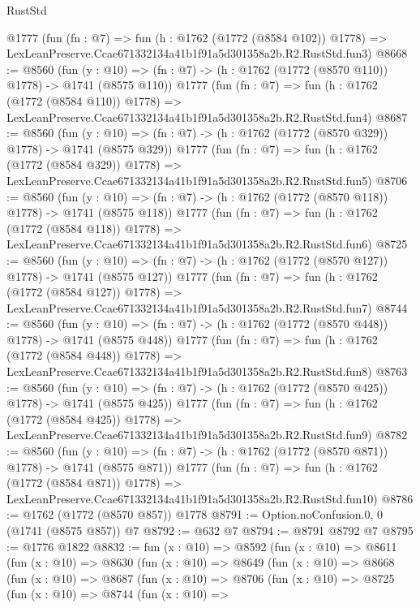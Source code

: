 \begin{lexlean}{RustStd}
\begin{coremodule}
    @1777
    (fun (fn : @7) =>
    fun (h : @1762 (@1772 (@8584 @102)) @1778) =>
    LexLeanPreserve.Ccae671332134a41b1f91a5d301358a2b.R2.RustStd.fun3)
@8668 := @8560
    (fun (y : @10) => (fn : @7) -> (h : @1762 (@1772 (@8570 @110)) @1778) -> @1741 (@8575 @110))
    @1777
    (fun (fn : @7) =>
    fun (h : @1762 (@1772 (@8584 @110)) @1778) =>
    LexLeanPreserve.Ccae671332134a41b1f91a5d301358a2b.R2.RustStd.fun4)
@8687 := @8560
    (fun (y : @10) => (fn : @7) -> (h : @1762 (@1772 (@8570 @329)) @1778) -> @1741 (@8575 @329))
    @1777
    (fun (fn : @7) =>
    fun (h : @1762 (@1772 (@8584 @329)) @1778) =>
    LexLeanPreserve.Ccae671332134a41b1f91a5d301358a2b.R2.RustStd.fun5)
@8706 := @8560
    (fun (y : @10) => (fn : @7) -> (h : @1762 (@1772 (@8570 @118)) @1778) -> @1741 (@8575 @118))
    @1777
    (fun (fn : @7) =>
    fun (h : @1762 (@1772 (@8584 @118)) @1778) =>
    LexLeanPreserve.Ccae671332134a41b1f91a5d301358a2b.R2.RustStd.fun6)
@8725 := @8560
    (fun (y : @10) => (fn : @7) -> (h : @1762 (@1772 (@8570 @127)) @1778) -> @1741 (@8575 @127))
    @1777
    (fun (fn : @7) =>
    fun (h : @1762 (@1772 (@8584 @127)) @1778) =>
    LexLeanPreserve.Ccae671332134a41b1f91a5d301358a2b.R2.RustStd.fun7)
@8744 := @8560
    (fun (y : @10) => (fn : @7) -> (h : @1762 (@1772 (@8570 @448)) @1778) -> @1741 (@8575 @448))
    @1777
    (fun (fn : @7) =>
    fun (h : @1762 (@1772 (@8584 @448)) @1778) =>
    LexLeanPreserve.Ccae671332134a41b1f91a5d301358a2b.R2.RustStd.fun8)
@8763 := @8560
    (fun (y : @10) => (fn : @7) -> (h : @1762 (@1772 (@8570 @425)) @1778) -> @1741 (@8575 @425))
    @1777
    (fun (fn : @7) =>
    fun (h : @1762 (@1772 (@8584 @425)) @1778) =>
    LexLeanPreserve.Ccae671332134a41b1f91a5d301358a2b.R2.RustStd.fun9)
@8782 := @8560
    (fun (y : @10) => (fn : @7) -> (h : @1762 (@1772 (@8570 @871)) @1778) -> @1741 (@8575 @871))
    @1777
    (fun (fn : @7) =>
    fun (h : @1762 (@1772 (@8584 @871)) @1778) =>
    LexLeanPreserve.Ccae671332134a41b1f91a5d301358a2b.R2.RustStd.fun10)
@8786 := @1762 (@1772 (@8570 @857)) @1778
@8791 := Option.noConfusion.{0, 0} (@1741 (@8575 @857)) @7
@8792 := @632 @7
@8794 := @8791 @8792 @7
@8795 := @1776 @1822
@8832 := fun (x : @10) =>
  @8592
    (fun (x : @10) =>
    @8611
      (fun (x : @10) =>
      @8630
        (fun (x : @10) =>
        @8649
          (fun (x : @10) =>
          @8668
            (fun (x : @10) =>
            @8687
              (fun (x : @10) =>
              @8706
                (fun (x : @10) =>
                @8725
                  (fun (x : @10) =>
                  @8744
                    (fun (x : @10) =>

\end{coremodule}
\end{lexlean}
